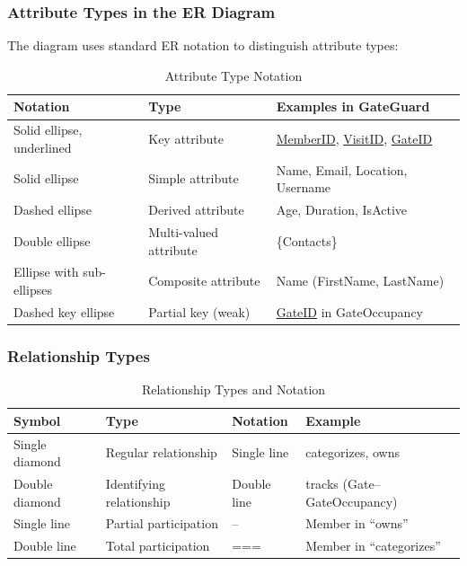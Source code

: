 \documentclass[a4paper, 12pt]{article}
\begin{document}
\subsubsection{Attribute Types in the ER Diagram}

The diagram uses standard ER notation to distinguish attribute types:

\begin{table}[H]
\centering
\caption{Attribute Type Notation}
\label{tab:attr-types}
\begin{tabularx}{\textwidth}{l l X}
\toprule
\textbf{Notation} & \textbf{Type} & \textbf{Examples in GateGuard} \\
\midrule
Solid ellipse, underlined & Key attribute & \underline{MemberID}, \underline{VisitID}, \underline{GateID} \\
Solid ellipse & Simple attribute & Name, Email, Location, Username \\
Dashed ellipse & Derived attribute & Age, Duration, IsActive \\
Double ellipse & Multi-valued attribute & \{Contacts\} \\
Ellipse with sub-ellipses & Composite attribute & Name (FirstName, LastName) \\
Dashed key ellipse & Partial key (weak) & \underline{GateID} in GateOccupancy \\
\bottomrule
\end{tabularx}
\end{table}

\subsubsection{Relationship Types}

\begin{table}[H]
\centering
\caption{Relationship Types and Notation}
\label{tab:rel-types}
\begin{tabularx}{\textwidth}{l l l X}
\toprule
\textbf{Symbol} & \textbf{Type} & \textbf{Notation} & \textbf{Example} \\
\midrule
Single diamond & Regular relationship & Single line & categorizes, owns \\
Double diamond & Identifying relationship & Double line & tracks (Gate--GateOccupancy) \\
Single line & Partial participation & -- & Member in ``owns'' \\
Double line & Total participation & === & Member in ``categorizes'' \\
\bottomrule
\end{tabularx}
\end{table}
\end{document}
